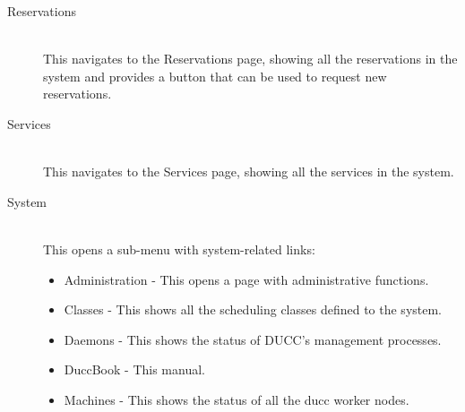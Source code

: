 \begin{description}
          \item[Reservations] \hfill \\
            This navigates to the Reservations page, showing all the reservations
            in the system and provides a button that can be used to request new reservations. 

          \item[Services] \hfill \\
            This navigates to the Services page, showing all the services in the
            system.

          \item[System] \hfill \\
            This opens a sub-menu with system-related links:
            \begin{itemize}
              \item Administration - This opens a page with administrative functions. 
              \item Classes - This shows all the scheduling classes defined to the system. 
              \item Daemons - This shows the status of DUCC's management processes. 
              \item DuccBook - This manual. 
              \item Machines - This shows the status of all the ducc worker nodes. 
            \end{itemize}
      \end{description}              

      \ifpdf
      \else
      \fi
      

      \ifpdf
      \else
      \fi
      

      \ifpdf
      \else
      \fi
      

      \ifpdf
      \else
      \fi
      

      \ifpdf
      \else
      \fi
      

      \ifpdf
      \else
      \fi
      

      \ifpdf
      \else
      \fi
      
